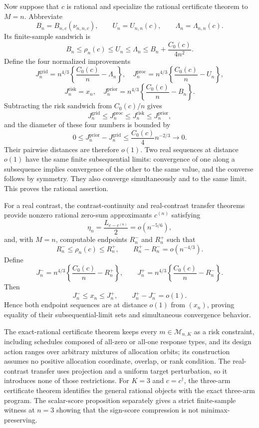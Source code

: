 Now suppose that \(c\) is rational and specialize the rational certificate theorem to \(M=n\). Abbreviate
\[
 B_n=B_{n,c}(\nu_{n,n,c}),\qquad
 U_n=U_{n,n}(c),\qquad
 \Lambda_n=\Lambda_{n,n}(c).
\]
Its finite-sample sandwich is
\[
 B_n\leq\rho_n(c)\leq U_n\leq\Lambda_n
 \leq B_n+\frac{C_0(c)}{4n^2}.
\]
Define the four normalized improvements
\[
 J_n^{\mathrm{grid}}=n^{4/3}\left\{\frac{C_0(c)}n-\Lambda_n\right\},
 \quad
 J_n^{\mathrm{proc}}=n^{4/3}\left\{\frac{C_0(c)}n-U_n\right\},
\]
\[
 J_n^{\mathrm{risk}}=x_n,
 \quad
 J_n^{\mathrm{prior}}=n^{4/3}\left\{\frac{C_0(c)}n-B_n\right\}.
\]
Subtracting the risk sandwich from \(C_0(c)/n\) gives
\[
 J_n^{\mathrm{grid}}\leq J_n^{\mathrm{proc}}
 \leq J_n^{\mathrm{risk}}\leq J_n^{\mathrm{prior}},
\]
and the diameter of these four numbers is bounded by
\[
 0\leq J_n^{\mathrm{prior}}-J_n^{\mathrm{grid}}
 \leq\frac{C_0(c)}4n^{-2/3}\longrightarrow0.
\]
Their pairwise distances are therefore \(o(1)\). Two real sequences at distance \(o(1)\) have the same finite subsequential limits: convergence of one along a subsequence implies convergence of the other to the same value, and the converse follows by symmetry. They also converge simultaneously and to the same limit. This proves the rational assertion.

For a real contrast, the contrast-continuity and real-contrast transfer theorems provide nonzero rational zero-sum approximants \(c^{(n)}\) satisfying
\[
 \eta_n=\frac{L_{c-c^{(n)}}}{2}=o(n^{-5/6}),
\]
and, with \(M=n\), computable endpoints \(R_n^-\) and \(R_n^+\) such that
\[
 R_n^-\leq\rho_n(c)\leq R_n^+,
 \qquad R_n^+-R_n^-=o(n^{-4/3}).
\]
Define
\[
 J_n^-=n^{4/3}\left\{\frac{C_0(c)}n-R_n^+\right\},
 \qquad
 J_n^+=n^{4/3}\left\{\frac{C_0(c)}n-R_n^-\right\}.
\]
Then
\[
 J_n^-\leq x_n\leq J_n^+,
 \qquad J_n^+-J_n^-=o(1).
\]
Hence both endpoint sequences are at distance \(o(1)\) from \((x_n)\), proving equality of their subsequential-limit sets and simultaneous convergence behavior.

The exact-rational certificate theorem keeps every \(m\in\mathcal M_{n,K}\) as a risk constraint, including schedules composed of all-zero or all-one response types, and its design action ranges over arbitrary mixtures of allocation orbits; its construction assumes no positive allocation coordinate, overlap, or rank condition. The real-contrast transfer uses projection and a uniform target perturbation, so it introduces none of those restrictions. For \(K=3\) and \(c=c^\dagger\), the three-arm certificate theorem identifies the general rational objects with the exact three-arm program. The scalar-score proposition separately gives a strict finite-sample witness at \(n=3\) showing that the sign-score compression is not minimax-preserving.

